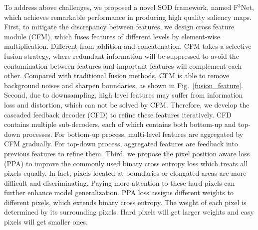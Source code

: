 \documentclass[letterpaper]{article} %
\begin{document}
To address above challenges, we proposed a novel SOD framework, named F$^3$Net, which achieves remarkable performance in producing high quality saliency maps. First, to mitigate the discrepancy between features, we design cross feature module (CFM), which fuses features of different levels by element-wise multiplication. Different from addition and concatenation, CFM takes a selective fusion strategy, where redundant information will be suppressed to avoid the contamination between features and important features will complement each other. Compared with traditional fusion methods, CFM is able to remove background noises and sharpen boundaries, as shown in Fig.~\ref{fusion_feature}. Second, due to downsampling, high level features may suffer from information loss and distortion, which can not be solved by CFM. Therefore, we develop the cascaded feedback decoder (CFD) to refine these features iteratively. CFD contains multiple sub-decoders, each of which contains both bottom-up and top-down processes. For bottom-up process, multi-level features are aggregated by CFM gradually. For top-down process, aggregated features are feedback into previous features to refine them. Third, we propose the pixel position aware loss (PPA) to improve the commonly used binary cross entropy loss which treats all pixels equally. In fact, pixels located at boundaries or elongated areas are more difficult and discriminating. Paying more attention to these hard pixels can further enhance model generalization. PPA loss assigns different weights to different pixels, which extends binary cross entropy. The weight of each pixel is determined by its surrounding pixels. Hard pixels will get larger weights and easy pixels will get smaller ones.
\end{document}
